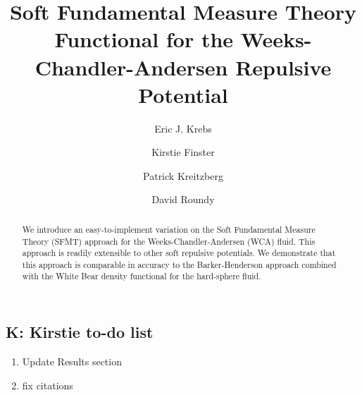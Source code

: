 \documentclass[letterpaper,twocolumn,amsmath,amssymb,prb]{revtex4-1}
\newcommand\kirstiesays[1]{{\bf \color{red}K: #1}}
\begin{document}
\title{Soft Fundamental Measure Theory Functional for the
  Weeks-Chandler-Andersen Repulsive Potential}

\author{Eric J. Krebs}

\author{Kirstie Finster}

\author{Patrick Kreitzberg}

\author{David Roundy}

\begin{abstract}
  We introduce an easy-to-implement variation on the Soft Fundamental
  Measure Theory (SFMT) approach for the Weeks-Chandler-Andersen (WCA)
  fluid.  This approach is readily extensible to other soft repulsive
  potentials.  We demonstrate that this approach is comparable in
  accuracy to the Barker-Henderson approach combined with the White
  Bear density functional for the hard-sphere fluid.
\end{abstract}

\maketitle



\subsection{\kirstiesays{Kirstie to-do list}}
\begin{enumerate}
\item Update Results section 
\item fix citations
\end{enumerate}
\end{document}
